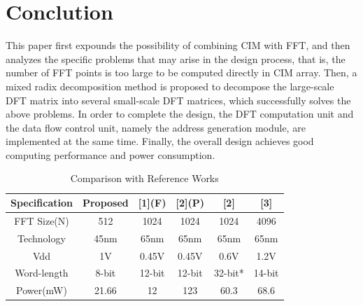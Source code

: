 \documentclass[journal]{IEEEtran}
\begin{document}
\section{Conclution}
This paper first expounds the possibility of combining CIM with FFT, and then analyzes the specific problems that may arise in the design process, that is, the number of FFT points is too large to be computed directly in CIM array. Then, a mixed radix decomposition method is proposed to decompose the large-scale DFT matrix into several small-scale DFT matrices, which successfully solves the above problems. In order to complete the design, the DFT computation unit and the data flow control unit, namely the address generation module, are implemented at the same time\cite{4}. Finally, the overall design achieves good \cite{5} computing \cite{6} performance and power \cite{7} consumption.


\begin{table}[htbp]
\centering
\caption{Comparison with Reference Works}
\label{Tab I}
    \begin{tabular}{cccccc}
        \hline
        Specification &Proposed &[1](F) &[2](P) &[2]      &[3] \\
        \hline
        FFT Size(N)   &512      &1024   &1024   &1024     &4096   \\
        Technology    &45nm     &65nm   &65nm   &65nm     &65nm   \\
        Vdd           &1V       &0.45V  &0.45V  &0.6V     &1.2V   \\
        Word-length   &8-bit    &12-bit &12-bit &32-bit*  &14-bit  \\
        Power(mW)     &21.66    &12     &123    &60.3     &68.6    \\
        \hline
    \end{tabular}
\end{table}


\ifCLASSOPTIONcaptionsoff
  \newpage
\fi



\end{document}
